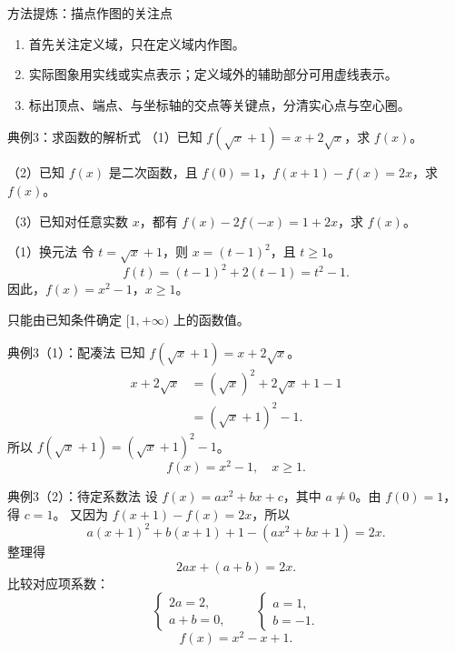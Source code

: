 \begin{frame}[t]{方法提炼：描点作图的关注点}
\begin{enumerate}
\setlength{\itemsep}{4mm}
\item 首先关注定义域，只在定义域内作图。
\item 实际图象用实线或实点表示；定义域外的辅助部分可用虚线表示。
\item 标出顶点、端点、与坐标轴的交点等关键点，分清实心点与空心圈。
\end{enumerate}
\vspace{3mm}
\end{frame}
\begin{frame}[t]{典例3：求函数的解析式}
\small
（1）已知 $f(\sqrt{x}+1)=x+2\sqrt{x}$，求 $f(x)$。\par
（2）已知 $f(x)$ 是二次函数，且 $f(0)=1$，$f(x+1)-f(x)=2x$，求 $f(x)$。\par
（3）已知对任意实数 $x$，都有 $f(x)-2f(-x)=1+2x$，求 $f(x)$。
\pause
\begin{block}{（1）换元法}
令 $t=\sqrt{x}+1$，则 $x=(t-1)^2$，且 $t\ge1$。
\[f(t)=(t-1)^2+2(t-1)=t^2-1.\]
因此，$f(x)=x^2-1$，$x\ge1$。
\end{block}
只能由已知条件确定 $[1,+\infty)$ 上的函数值。
\end{frame}
\begin{frame}[t]{典例3（1）：配凑法}
已知 $f(\sqrt{x}+1)=x+2\sqrt{x}$。
\vspace{3mm}
\begin{align*}
x+2\sqrt{x}&=(\sqrt{x})^2+2\sqrt{x}+1-1\\
&=(\sqrt{x}+1)^2-1.
\end{align*}
所以 $f(\sqrt{x}+1)=(\sqrt{x}+1)^2-1$。
\[\boxed{f(x)=x^2-1,\quad x\ge1.}\]
\end{frame}
\begin{frame}[t]{典例3（2）：待定系数法}
设 $f(x)=ax^2+bx+c$，其中 $a\ne0$。由 $f(0)=1$，得 $c=1$。
又因为 $f(x+1)-f(x)=2x$，所以
\[a(x+1)^2+b(x+1)+1-(ax^2+bx+1)=2x.\]
整理得
\[2ax+(a+b)=2x.\]
比较对应项系数：
\[\begin{cases}2a=2,\\a+b=0,\end{cases}\qquad
\begin{cases}a=1,\\b=-1.\end{cases}\]
\[\boxed{f(x)=x^2-x+1.}\]
\end{frame}
